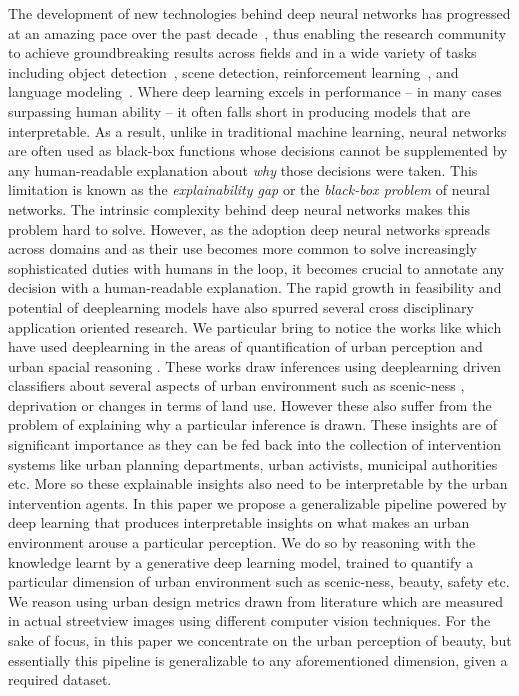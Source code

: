%


The development of new technologies behind deep neural networks has progressed at an amazing pace over the past decade~\cite{lecun2015deep}, thus enabling the research community to achieve groundbreaking results across fields and in a wide variety of tasks including object detection~\cite{szegedy2013deep}, scene detection, reinforcement learning~\cite{mnih2015human}, and language modeling~\cite{arisoy2012deep}. Where deep learning excels in performance -- in many cases surpassing human ability -- it often falls short in producing models that are interpretable. As a result, unlike in traditional machine learning, neural networks are often used as black-box functions whose decisions cannot be supplemented by any human-readable explanation about \textit{why} those decisions were taken. This limitation is known as the \textit{explainability gap} or the \textit{black-box problem} of neural networks. The intrinsic complexity behind deep neural networks makes this problem hard to solve. However, as the adoption deep neural networks spreads across domains and as their use becomes more common to solve increasingly sophisticated duties with humans in the loop, it becomes crucial to annotate any decision with a human-readable explanation.
The rapid growth in feasibility and potential of deeplearning models have also spurred several cross disciplinary application oriented research. We particular bring to notice the works like \cite{naik2014streetscore,seresinhe2017using,Law:2017:ACN:3149808.3149810,seresinhe2015quantifying,naik2017computer} which have used deeplearning in the areas of quantification of urban perception and urban spacial reasoning . These works draw inferences using deeplearning driven classifiers about several aspects of urban environment such as scenic-ness , deprivation or changes in terms of land use.  However these also suffer from the problem of explaining why a particular inference is drawn. These insights are of significant importance as they can be fed back into the collection of intervention systems like urban planning departments, urban activists, municipal authorities etc. More so these explainable insights also need to be interpretable by the urban intervention agents.  
In this paper we propose a generalizable pipeline powered by deep learning that produces interpretable insights on what makes an urban environment arouse a particular perception. We do so by reasoning with the knowledge learnt by a generative deep learning model, trained to quantify a particular dimension of urban environment such as scenic-ness, beauty, safety etc. We reason using urban design metrics drawn from literature which are measured in actual streetview images using different computer vision techniques. For the sake of focus, in this paper we concentrate on the urban perception of beauty, but essentially this pipeline is generalizable to any aforementioned dimension, given a required dataset. 

